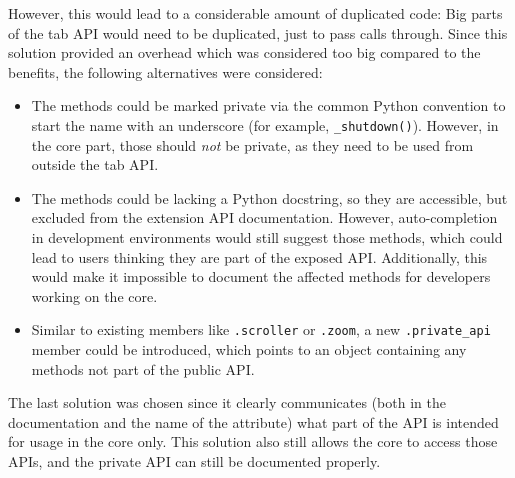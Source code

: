 \documentclass[a4paper,parskip=full]{scrreprt}
\newcommand{\py}[1]{\texttt{#1}}
\begin{document}
However, this would lead to a considerable amount of duplicated code: Big parts
of the tab API would need to be duplicated, just to pass calls through. Since
this solution provided an overhead which was considered too big compared to the
benefits, the following alternatives were considered:

\begin{itemize}
  \item The methods could be marked private via the common Python convention to
    start the name with an underscore (for example, \py{_shutdown()}).
    However, in the core part, those should \emph{not} be private, as they need to
    be used from outside the tab API.
  \item The methods could be lacking a Python docstring, so they are accessible,
    but excluded from the extension API documentation. However, auto-completion
    in development environments would still suggest those methods, which could
    lead to users thinking they are part of the exposed API. Additionally, this
    would make it impossible to document the affected methods for developers
    working on the core.
  \item Similar to existing members like \verb|.scroller| or \verb|.zoom|, a new
    \verb|.private_api| member could be introduced, which points to an object
    containing any methods not part of the public API.
\end{itemize}

The last solution was chosen since it clearly communicates (both in the
documentation and the name of the attribute) what part of the API is intended
for usage in the core only. This solution also still allows the core to access
those APIs, and the private API can still be documented properly.

\newenvironment{umlhighlight}{%
  \let\oldumlfillcolor\umlfillcolor%
  \renewcommand{\umlfillcolor}{yellow}%
}{%
  \renewcommand\umlfillcolor{\oldumlfillcolor}
}
\end{document}
